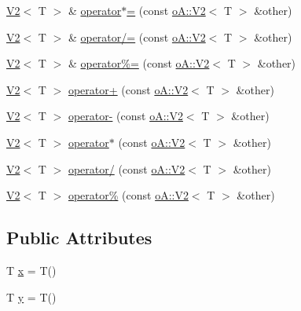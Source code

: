 \begin{DoxyCompactItemize}
\item 
\mbox{\hyperlink{structo_a_1_1_v2}{V2}}$<$ T $>$ \& \mbox{\hyperlink{structo_a_1_1_v2_ae618eb05f845b5a4219d198e33f79699}{operator$\ast$=}} (const \mbox{\hyperlink{structo_a_1_1_v2}{o\+A\+::\+V2}}$<$ T $>$ \&other)
\item 
\mbox{\hyperlink{structo_a_1_1_v2}{V2}}$<$ T $>$ \& \mbox{\hyperlink{structo_a_1_1_v2_a9305c1fafa282470c0670119733f346c}{operator/=}} (const \mbox{\hyperlink{structo_a_1_1_v2}{o\+A\+::\+V2}}$<$ T $>$ \&other)
\item 
\mbox{\hyperlink{structo_a_1_1_v2}{V2}}$<$ T $>$ \& \mbox{\hyperlink{structo_a_1_1_v2_acd10d3ff2a5744713a159eebd0d89a4e}{operator\%=}} (const \mbox{\hyperlink{structo_a_1_1_v2}{o\+A\+::\+V2}}$<$ T $>$ \&other)
\item 
\mbox{\hyperlink{structo_a_1_1_v2}{V2}}$<$ T $>$ \mbox{\hyperlink{structo_a_1_1_v2_a9b089bbe3ae2f0a2166a79eb240159ad}{operator+}} (const \mbox{\hyperlink{structo_a_1_1_v2}{o\+A\+::\+V2}}$<$ T $>$ \&other)
\item 
\mbox{\hyperlink{structo_a_1_1_v2}{V2}}$<$ T $>$ \mbox{\hyperlink{structo_a_1_1_v2_af1a6777d0bae8bbe2aeee4f15da03162}{operator-\/}} (const \mbox{\hyperlink{structo_a_1_1_v2}{o\+A\+::\+V2}}$<$ T $>$ \&other)
\item 
\mbox{\hyperlink{structo_a_1_1_v2}{V2}}$<$ T $>$ \mbox{\hyperlink{structo_a_1_1_v2_a9e3ca71d8d85ad4bbcb418080acafceb}{operator$\ast$}} (const \mbox{\hyperlink{structo_a_1_1_v2}{o\+A\+::\+V2}}$<$ T $>$ \&other)
\item 
\mbox{\hyperlink{structo_a_1_1_v2}{V2}}$<$ T $>$ \mbox{\hyperlink{structo_a_1_1_v2_a62fad7a505de2e093da7d9d8a01342c2}{operator/}} (const \mbox{\hyperlink{structo_a_1_1_v2}{o\+A\+::\+V2}}$<$ T $>$ \&other)
\item 
\mbox{\hyperlink{structo_a_1_1_v2}{V2}}$<$ T $>$ \mbox{\hyperlink{structo_a_1_1_v2_a0566d5d8796320c591462eb26ebffdce}{operator\%}} (const \mbox{\hyperlink{structo_a_1_1_v2}{o\+A\+::\+V2}}$<$ T $>$ \&other)
\end{DoxyCompactItemize}
\subsection*{Public Attributes}
\begin{DoxyCompactItemize}
\item 
T \mbox{\hyperlink{structo_a_1_1_v2_ac1fdde8edfc1fdf4181450eb85795088}{x}} = T()
\item 
T \mbox{\hyperlink{structo_a_1_1_v2_a9437a06af6b8e5407e361b6bfc067225}{y}} = T()
\end{DoxyCompactItemize}


